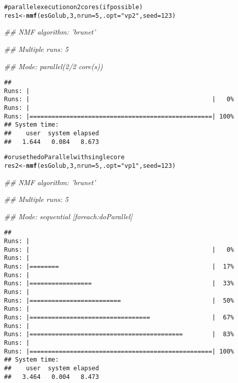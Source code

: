 \documentclass[a4paper]{article}\usepackage{graphicx, color}
\makeatletter
\newcommand{\hlfunctioncall}[1]{\textcolor[rgb]{0.501960784313725,0,0.329411764705882}{\textbf{#1}}}%
\newcommand{\hlstring}[1]{\textcolor[rgb]{0.6,0.6,1}{#1}}%
\newcommand{\hlcomment}[1]{\textcolor[rgb]{0.180392156862745,0.6,0.341176470588235}{#1}}%
\newenvironment{kframe}{%
 \def\at@end@of@kframe{}%
 \ifinner\ifhmode%
  \def\at@end@of@kframe{\end{minipage}}%
  \begin{minipage}{\columnwidth}%
 \fi\fi%
 \def\FrameCommand##1{\hskip\@totalleftmargin \hskip-\fboxsep
 \colorbox{shadecolor}{##1}\hskip-\fboxsep
     \hskip-\linewidth \hskip-\@totalleftmargin \hskip\columnwidth}%
 \MakeFramed {\advance\hsize-\width
   \@totalleftmargin\z@ \linewidth\hsize
   \@setminipage}}%
 {\par\unskip\endMakeFramed%
 \at@end@of@kframe}
\newenvironment{knitrout}{}{} %
\makeatother
\begin{document}
\begin{knitrout}
\color{fgcolor}\begin{kframe}
\begin{alltt}
\hlcomment{# parallel execution on 2 cores (if possible)}
res1 <- \hlfunctioncall{nmf}(esGolub, 3, nrun = 5, .opt = \hlstring{"vp2"}, seed = 123)
\end{alltt}


{\ttfamily\noindent\itshape\textcolor{messagecolor}{\#\# NMF algorithm: 'brunet'}}

{\ttfamily\noindent\itshape\textcolor{messagecolor}{\#\# Multiple runs: 5}}

{\ttfamily\noindent\itshape\textcolor{messagecolor}{\#\# Mode: parallel(2/2 core(s))}}\begin{verbatim}
## 
Runs: |                                                        
Runs: |                                                  |   0%
Runs: |                                                        
Runs: |==================================================| 100%
## System time:
##    user  system elapsed 
##   1.644   0.084   8.673
\end{verbatim}
\begin{alltt}

\hlcomment{# or use the doParallel with single core}
res2 <- \hlfunctioncall{nmf}(esGolub, 3, nrun = 5, .opt = \hlstring{"vp1"}, seed = 123)
\end{alltt}


{\ttfamily\noindent\itshape\textcolor{messagecolor}{\#\# NMF algorithm: 'brunet'}}

{\ttfamily\noindent\itshape\textcolor{messagecolor}{\#\# Multiple runs: 5}}

{\ttfamily\noindent\itshape\textcolor{messagecolor}{\#\# Mode: sequential [foreach:doParallel]}}\begin{verbatim}
## 
Runs: |                                                        
Runs: |                                                  |   0%
Runs: |                                                        
Runs: |========                                          |  17%
Runs: |                                                        
Runs: |=================                                 |  33%
Runs: |                                                        
Runs: |=========================                         |  50%
Runs: |                                                        
Runs: |=================================                 |  67%
Runs: |                                                        
Runs: |==========================================        |  83%
Runs: |                                                        
Runs: |==================================================| 100%
## System time:
##    user  system elapsed 
##   3.464   0.004   8.473
\end{verbatim}
\begin{alltt}


\end{alltt}
\end{kframe}
\end{knitrout}
\end{document}
